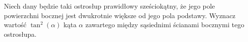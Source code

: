 Niech dany będzie taki ostrosłup prawidłowy sześciokątny, że jego pole powierzchni bocznej jest dwukrotnie większe od jego pola podstawy. Wyznacz wartość $\tan^{2}(\alpha)$ kąta $\alpha$ zawartego między sąsiednimi ścianami bocznymi tego ostrosłupa.